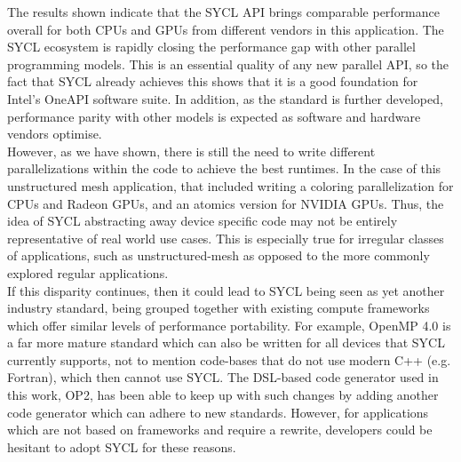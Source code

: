 \documentclass[runningheads]{llncs}
\begin{document}
\noindent The results shown indicate that the SYCL API brings comparable performance 
overall for both CPUs and GPUs from different vendors in this application. The 
SYCL ecosystem is rapidly closing the performance gap with other parallel 
programming models. This is an essential quality of any new parallel API, so the 
fact that SYCL already achieves this shows that it is a good foundation for 
Intel's OneAPI software suite. In addition, as the standard is further 
developed, performance parity with other models is expected as software and 
hardware vendors optimise. \\
\indent However, as we have shown, there is still the need to write different 
parallelizations within the code to achieve the best runtimes. In the case 
of this unstructured mesh application, that included writing a coloring 
parallelization for CPUs and Radeon GPUs, and an atomics version for 
NVIDIA GPUs. Thus, the idea of SYCL abstracting away device specific code may 
not be entirely representative of real world use cases. This is especially true 
for irregular classes of applications, such as unstructured-mesh as opposed to 
the more commonly explored regular applications.\\
\indent If this disparity continues, then it could lead to SYCL being seen as 
yet another industry standard, being grouped together with existing compute 
frameworks which offer similar levels of performance portability. For example, 
OpenMP 4.0 is a far more mature standard which can also be written for all 
devices that SYCL currently supports, not to mention code-bases that do not use 
modern C++ (e.g. Fortran), which then cannot use SYCL. The DSL-based code 
generator used in this work, OP2, has been able to keep up with such changes by 
adding another code generator which can adhere to new standards. However, for 
applications which are not based on frameworks and require a rewrite, developers 
could be hesitant to adopt SYCL for these reasons. 



\end{document}
